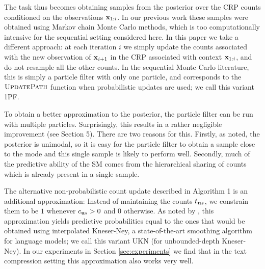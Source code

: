 The task thus becomes obtaining samples from the posterior over the CRP counts conditioned on the observations $\xbf_{1:i}$.  In our previous work \citep{Teh:ACL06, wood2009sms} these samples were obtained using Markov chain Monte Carlo methods, which is too computationally intensive for the sequential setting considered here.   
In this paper we take a different approach: at each iteration $i$ we simply
update the counts associated with the new observation of $\xbf_{i+1}$ in the CRP
associated with context ${\xbf_{1:i}}$, and do not resample all the other
counts.  In the sequential Monte Carlo literature, this is simply a particle
filter with only one particle, and corresponds to the $\UpdatePath$ function when
probabilistic updates are used; we call this variant 1PF.



To obtain a better approximation to the posterior, the particle filter can be
run with multiple particles.  Surprisingly, this results in a rather
negligible improvement (see Section 5).  There are two reasons for this.
Firstly, as \citep{Teh:ACL06} noted, the posterior is unimodal, so it is easy
for the particle filter to obtain a sample close to the mode and this single
sample is likely to perform well.  Secondly, much of the predictive ability of
the SM comes from the hierarchical sharing of counts which is already present
in a single sample.  

The alternative non-probabilistic count update described in Algorithm 1 is an additional
approximation: Instead of maintaining the counts $t_{\ubf s}$, we constrain
them to be $1$ whenever $c_{\ubf s}>0$ and 0 otherwise. As noted by
\citep{Teh:ACL06}, this approximation yields predictive probabilities equal to
the ones that would be obtained using interpolated Kneser-Ney, a
state-of-the-art smoothing algorithm for language models; we call this variant
UKN (for unbounded-depth Kneser-Ney). In our experiments in Section
\ref{sec:experiments} we find that in the text compression setting this
approximation also works very well.

